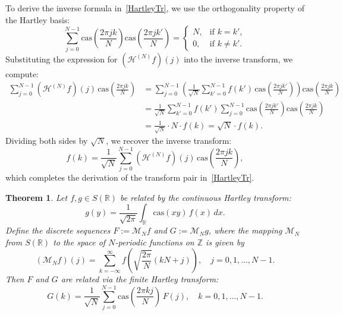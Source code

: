 \documentclass[12 pt]{amsart}
\numberwithin{equation}{section}
\newtheorem{theorem}{Theorem}[section]
\begin{document}
To derive the inverse formula in~\eqref{HartleyTr}, we use the orthogonality property of the Hartley basis:
\begin{equation*}
\sum_{j=0}^{N-1} \mathrm{cas}\left( \frac{2\pi j k}{N} \right) \mathrm{cas}\left( \frac{2\pi j k'}{N} \right) =
\begin{cases}
N, & \text{if } k = k', \\
0, & \text{if } k \neq k'.
\end{cases}
\end{equation*}
Substituting the expression for \( (\mathcal{H}^{(N)}f)(j) \) into the inverse transform, we compute:
\begin{align*}
\sum_{j=0}^{N-1} (\mathcal{H}^{(N)}f)(j) \, \mathrm{cas}\left( \frac{2\pi j k}{N} \right)
&= \sum_{j=0}^{N-1} \left( \frac{1}{\sqrt{N}} \sum_{k'=0}^{N-1} f(k') \, \mathrm{cas}\left( \frac{2\pi j k'}{N} \right) \right)
\mathrm{cas}\left( \frac{2\pi j k}{N} \right) \\
&= \frac{1}{\sqrt{N}} \sum_{k'=0}^{N-1} f(k') \sum_{j=0}^{N-1}
\mathrm{cas}\left( \frac{2\pi j k'}{N} \right) \mathrm{cas}\left( \frac{2\pi j k}{N} \right)\\&=\frac{1}{\sqrt{N}} \cdot N \cdot f(k) = \sqrt{N} \cdot f(k).
\end{align*}
Dividing both sides by \( \sqrt{N} \), we recover the inverse transform:
\[
f(k) = \frac{1}{\sqrt{N}} \sum_{j=0}^{N-1} (\mathcal{H}^{(N)}f)(j) \, \mathrm{cas}\left( \frac{2\pi j k}{N} \right),
\]
which completes the derivation of the transform pair in~\eqref{HartleyTr}.


\begin{theorem}\label{T2}
Let \( f, g \in S(\mathbb{R}) \) be related by the continuous Hartley transform:
\begin{equation*}
g(y) = \frac{1}{\sqrt{2\pi}} \int_{\mathbb{R}} \mathrm{cas}(x y)\, f(x)\, dx.
\end{equation*}
Define the discrete sequences \( F := \mathscr{M}_N f \) and \( G := \mathscr{M}_N g \), where the mapping \( \mathscr{M}_N \) from \( S(\mathbb{R}) \) to the space of \( N \)-periodic functions on \( \mathbb{Z} \) is given by
\begin{equation*}
(\mathscr{M}_{N}f)(j) = \sum_{k=-\infty}^\infty f\left( \sqrt{\frac{2\pi}{N}}(kN + j) \right), \quad j = 0, 1, \dots, N-1.
\end{equation*}
Then \( F \) and \( G \) are related via the finite Hartley transform:
\begin{equation*}
G(k) = \frac{1}{\sqrt{N}} \sum_{j=0}^{N-1} \mathrm{cas}\left( \frac{2\pi kj}{N} \right)\, F(j), \quad k = 0, 1, \dots, N-1.
\end{equation*}
\end{theorem}
\end{document}
